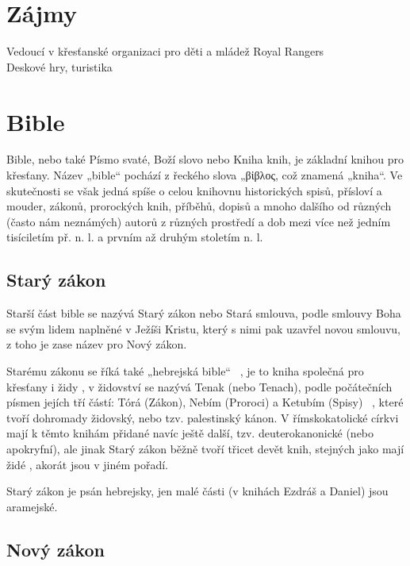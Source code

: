\documentclass[letterpaper,12pt,oneside]{article}
\begin{document}
\section*{Zájmy}
Vedoucí v křesťanské organizaci pro děti a mládež Royal Rangers \\
Deskové hry, turistika
 

\newpage

\clearpage

\section{Bible}

Bible, nebo také Písmo svaté, Boží slovo nebo Kniha knih, je základní knihou pro křesťany. Název „bible“ pochází z řeckého slova „\textgreek{βἰβλος}, což znamená „kniha“. Ve skutečnosti se však jedná spíše o celou knihovnu historických spisů, přísloví a mouder, zákonů, prorockých knih, příběhů, dopisů a mnoho dalšího od různých (často nám neznámých) autorů z různých prostředí a dob mezi více než jedním tisíciletím př. n. l. a prvním až druhým stoletím n. l.

\subsection{Starý zákon}

Starší část bible se nazývá Starý zákon nebo Stará smlouva, podle smlouvy Boha se svým lidem naplněné v Ježíši Kristu, který s nimi pak uzavřel novou smlouvu, z toho je zase název pro Nový zákon.

Starému zákonu se říká také „hebrejská bible“ ~\cite{online-bible}, je to kniha společná pro křesťany  i židy , v židovství se nazývá Tenak (nebo Tenach), podle počátečních písmen jejích tří částí: Tórá (Zákon), Nebím (Proroci) a Ketubím (Spisy) ~\cite[strana 17]{cep},  které tvoří dohromady židovský, nebo tzv. palestinský kánon. V římskokatolické církvi  mají k těmto knihám přidané navíc ještě další, tzv. deuterokanonické (nebo apokryfní), ale jinak Starý zákon běžně tvoří třicet devět knih, stejných jako mají židé , akorát jsou v jiném pořadí.

Starý zákon je psán hebrejsky, jen malé části (v knihách Ezdráš a Daniel) jsou aramejské.

\subsection{Nový zákon}
\end{document}
